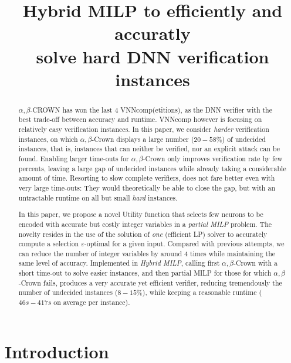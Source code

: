 \documentclass{llncs}
\title{Hybrid MILP to efficiently and accuratly \\  solve hard DNN verification instances}
\date{}
\begin{document}
	
	\maketitle
	
	\begin{abstract}
		$\alpha,\beta$-CROWN has won the last 4 VNNcomp(etitions), as the DNN verifier with the best 
		trade-off between accuracy and runtime. VNNcomp however is focusing on relatively easy verification instances. In this paper, we consider {\em harder} verification instances, on which $\alpha,\beta$-Crown displays a large number ($20-58\%$) of undecided instances, that is, instances that can neither be verified, nor an explicit attack can be found. Enabling larger time-outs for $\alpha,\beta$-Crown only improves verification rate by few percents, leaving a large gap of undecided instances while already taking a considerable amount of time. Resorting to slow complete verifiers, does not fare better even with very large time-outs: They would theoretically be able to close the gap, but with an untractable runtime on all but small {\em hard} instances.
		
		In this paper, {\color{blue}
			we propose a novel Utility function that selects few neurons to be encoded with accurate but costly integer variables in a {\em partial MILP} problem. The novelty resides in the use of 
			the solution of {\em one} (efficient LP) solver to accurately compute a selection $\varepsilon$-optimal for a given input. }
		Compared with previous attempts, we can reduce the number of integer variables by around 4 times while maintaining the same level of accuracy. Implemented in {\em Hybrid MILP}, calling first $\alpha,\beta$-Crown with a short time-out to solve easier instances, and then partial MILP for those for which $\alpha,\beta$-Crown fails, produces a very accurate yet efficient verifier, reducing tremendously the number of undecided instances ($8-15\%$), while keeping a reasonable runtime ($46s-417s$ on average per instance).
	\end{abstract}
	

\section{Introduction}
\end{document}
